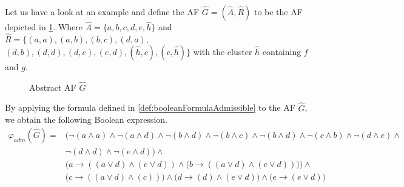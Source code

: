 \begin{example}
    Let us have a look at an example and define the AF $\hat{G}=(\hat{A},\hat{R})$ to be the AF depicted in \cref{af:algorithmEncodingsAdmissible}. Where $\hat{A}=\{a, b, c, d, e, \hat{h}\}$ and $\hat{R}=\big\{ (a,a), (a,b), (b,c), (d,a),$ $(d,b), (d,d), (d, e), (e, d), (\hat{h}, c), (c, \hat{h})\big\}$ with the cluster $\hat{h}$ containing $f$ and $g$.

    \begin{figure}[H]
        \centering
        \caption{Abstract AF $\hat{G}$}
        \label{af:algorithmEncodingsAdmissible}
    \end{figure}

By applying the formula defined in \cref{def:booleanFormulaAdmissible} to the AF $\hat{G}$, we obtain the following Boolean expression.
\begin{align*}
    \varphi_{adm}(\hat{G}) = &\big(
     \lnot (a \land a) \land \lnot (a \land d) \land \lnot (b \land d) \land \lnot (b \land c) \land \lnot (b \land d) \land \lnot (c \land b) \land \lnot (d \land e) \land \\
      & \lnot (d \land d) \land \lnot (e \land d) \big) \land\\
      &\bigl( a \rightarrow ((a \lor d) \land (e \lor d)) \land \bigl( b \rightarrow ((a \lor d) \land (e \lor d)) \bigl) \bigl) \land\\
      &\bigl( c \rightarrow ((a \lor d) \land (c)) \bigl) \land \bigl( d \rightarrow (d) \land (e \lor d) \bigl) \land \bigl( e \rightarrow (e \lor d) \bigl)
\end{align*}


\end{example}
